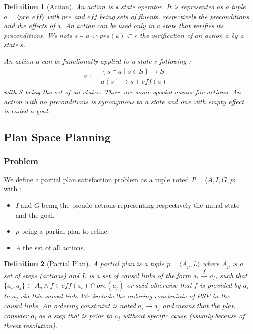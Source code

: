 \documentclass[]{article}
\providecommand{\tightlist}{%
  \setlength{\itemsep}{0pt}\setlength{\parskip}{0pt}}
\newtheorem{definition}{Definition}
\begin{document}
\begin{definition}[Action]

An action is a state operator. It is represented as a tuple
\(a = \langle pre, eff \rangle\) with \(pre\) and \(eff\) being sets of
fluents, respectively the preconditions and the effects of \(a\). An
action can be used only in a state that verifies its preconditions. We
note \(s \models a \Leftrightarrow pre(a) \subset s\) the verification
of an action \(a\) by a state \(s\).

An action \(a\) can be functionally applied to a state \(s\) following :
\[a:= \substack{ \left\{ s \models a \middle| s \in S\right\} \to S\\
    a(s) \mapsto s + eff(a)}\] with \(S\) being the set of all states.
There are some special names for actions. An action with no
preconditions is synonymous to a state and one with empty effect is
called a goal.

\end{definition}

\subsection{Plan Space Planning}\label{plan-space-planning}

\subsubsection{Problem}\label{problem}

We define a partial plan satisfaction problem as a tuple noted
\(P = \langle A, I, G, p \rangle\) with :

\begin{itemize}
\tightlist
\item
  \(I\) and \(G\) being the pseudo actions representing respectively the
  initial state and the goal.
\item
  \(p\) being a partial plan to refine.
\item
  \(A\) the set of all actions.
\end{itemize}

\begin{definition}[Partial Plan]

A \emph{partial plan} is a tuple \(p = \langle A_p, L\rangle\) where
\(A_p\) is a set of steps (actions) and \(L\) is a set of causal links
of the form \(a_i \xrightarrow{f} a_j\), such that
\(\{ a_i, a_j \} \subset A_p \land f \in eff(a_i) \cap pre(a_j)\) or
said otherwise that \(f\) is provided by \(a_i\) to \(a_j\) via this
causal link. We include the ordering constraints of PSP in the causal
links. An ordering constraint is noted \(a_i \to a_j\) and means that
the plan consider \(a_i\) as a step that is prior to \(a_j\) without
specific cause (usually because of threat resolution).

\end{definition}
\end{document}

